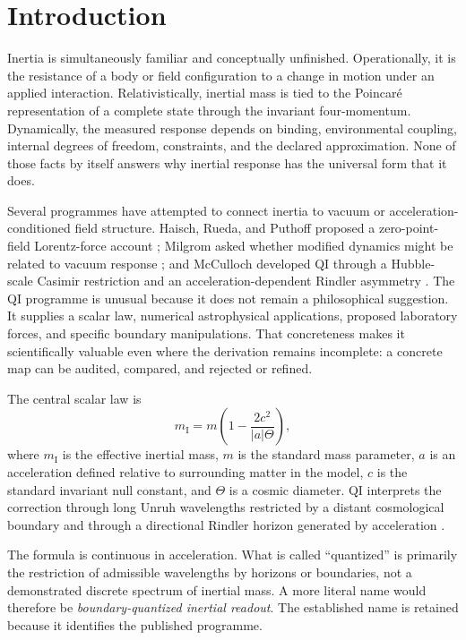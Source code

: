 \documentclass[11pt]{article}
\begin{document}
\section{Introduction}
\label{sec:introduction}

Inertia is simultaneously familiar and conceptually unfinished. Operationally, it is the resistance of a body or field configuration to a change in motion under an applied interaction. Relativistically, inertial mass is tied to the Poincar\'e representation of a complete state through the invariant four-momentum. Dynamically, the measured response depends on binding, environmental coupling, internal degrees of freedom, constraints, and the declared approximation. None of those facts by itself answers why inertial response has the universal form that it does.

Several programmes have attempted to connect inertia to vacuum or acceleration-conditioned field structure. Haisch, Rueda, and Puthoff proposed a zero-point-field Lorentz-force account \cite{Haisch1994}; Milgrom asked whether modified dynamics might be related to vacuum response \cite{Milgrom1999}; and McCulloch developed QI through a Hubble-scale Casimir restriction and an acceleration-dependent Rindler asymmetry \cite{McCulloch2007,McCulloch2010,McCulloch2013}. The QI programme is unusual because it does not remain a philosophical suggestion. It supplies a scalar law, numerical astrophysical applications, proposed laboratory forces, and specific boundary manipulations. That concreteness makes it scientifically valuable even where the derivation remains incomplete: a concrete map can be audited, compared, and rejected or refined.

The central scalar law is
\begin{equation}
    m_{\mathrm I}
    =m\left(1-\frac{2c^{2}}{|a|\Theta}\right),
    \label{eq:qi_main}
\end{equation}
where \(m_{\mathrm I}\) is the effective inertial mass, \(m\) is the standard mass parameter, \(a\) is an acceleration defined relative to surrounding matter in the model, \(c\) is the standard invariant null constant, and \(\Theta\) is a cosmic diameter. QI interprets the correction through long Unruh wavelengths restricted by a distant cosmological boundary and through a directional Rindler horizon generated by acceleration \cite{McCulloch2007,McCulloch2013,McCulloch2016}.

The formula is continuous in acceleration. What is called ``quantized'' is primarily the restriction of admissible wavelengths by horizons or boundaries, not a demonstrated discrete spectrum of inertial mass. A more literal name would therefore be \emph{boundary-quantized inertial readout}. The established name is retained because it identifies the published programme.
\end{document}
